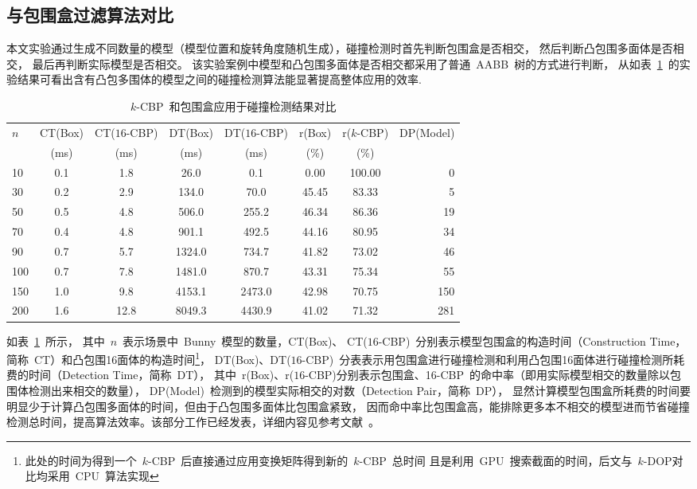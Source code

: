 \subsection{与包围盒过滤算法对比}
\label{subsec:exper:box:kcbp}

本文实验通过生成不同数量的模型（模型位置和旋转角度随机生成），碰撞检测时首先判断包围盒是否相交， 然后判断凸包围多面体是否相交， 最后再判断实际模型是否相交。
该实验案例中模型和凸包围多面体是否相交都采用了普通~AABB~树的方式进行判断，
从如表~\ref{tab:exp:box:kcbp:collsiondetection}~的实验结果可看出含有凸包多围体的模型之间的碰撞检测算法能显著提高整体应用的效率. 

\begin{table}[htbp]
\caption{$k$-CBP~和包围盒应用于碰撞检测结果对比}
\label{tab:exp:box:kcbp:collsiondetection}
\centering
\begin{tabular}{lccccccr}
 \toprule[1.5pt]
 \multirow{2}{*}{$n$} & CT(Box) & CT($16$-CBP) & DT(Box) & DT($16$-CBP) & r(Box) & r($k$-CBP) & \multirow{2}{*}{DP(Model)} \\
                      & (ms)    & (ms)          & (ms)  & (ms)          & (\%)      & (\%)  &   \\
  \midrule[1.0pt]
   10 & 0.1 & 1.8 &    26.0  & 0.1    & 0.00  & 100.00 & 0\\
   30 & 0.2 & 2.9 &   134.0  & 70.0   & 45.45 & 83.33 & 5\\
   50 & 0.5 & 4.8 &   506.0  & 255.2  & 46.34 & 86.36 & 19 \\
   70 & 0.4 & 4.8 &   901.1  & 492.5  & 44.16 & 80.95 & 34 \\
   90 & 0.7 & 5.7 &  1324.0  & 734.7  & 41.82 & 73.02 & 46 \\
  100 & 0.7 & 7.8 &  1481.0  & 870.7  & 43.31 & 75.34 & 55 \\
  150 & 1.0 & 9.8 &  4153.1  & 2473.0 & 42.98 & 70.75 & 150 \\
  200 & 1.6 & 12.8 & 8049.3  & 4430.9 & 41.02 & 71.32 & 281 \\
  \bottomrule[1.5pt]
 \end{tabular}
\end{table}

如表~\ref{tab:exp:box:kcbp:collsiondetection}~所示，
其中~$n$~表示场景中~Bunny~模型的数量，CT(Box)、 CT($16$-CBP)~分别表示模型包围盒的构造时间（Construction Time，简称~CT）和凸包围16面体的构造时间\footnote{此处的时间为得到一个~$k$-CBP~后直接通过应用变换矩阵得到新的~$k$-CBP~总时间
且是利用~GPU~搜索截面的时间，后文与~$k$-DOP对比均采用~CPU~算法实现}， DT(Box)、DT($16$-CBP)~分表表示用包围盒进行碰撞检测和利用凸包围16面体进行碰撞检测所耗费的时间（Detection Time，简称~DT），
其中~r(Box)、r($16$-CBP)分别表示包围盒、16-CBP~的命中率（即用实际模型相交的数量除以包围体检测出来相交的数量）， DP(Model)~检测到的模型实际相交的对数（Detection Pair，简称~DP），
显然计算模型包围盒所耗费的时间要明显少于计算凸包围多面体的时间，但由于凸包围多面体比包围盒紧致，
因而命中率比包围盒高，能排除更多本不相交的模型进而节省碰撞检测总时间，提高算法效率。该部分工作已经发表，详细内容见参考文献~。

